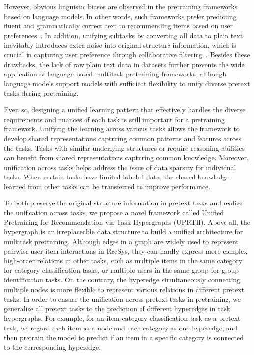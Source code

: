 However, obvious linguistic biases are observed in the pretraining frameworks based on language models. In other words, such frameworks prefer predicting fluent and grammatically correct text to recommending items based on user preferences~\cite{Zhang2021}. In addition, unifying subtasks by converting all data to plain text inevitably introduces extra noise into original structure information, which is crucial in capturing user preference through collaborative filtering~\cite{glrssurvey21}. Besides these drawbacks, the lack of raw plain text data in datasets further prevents the wide application of language-based multitask pretraining frameworks, although language models support models with sufficient flexibility to unify diverse pretext tasks during pretraining.

Even so, designing a unified learning pattern that effectively handles the diverse requirements and nuances of each task is still important for a pretraining framework. Unifying the learning across various tasks allows the framework to develop shared representations capturing common patterns and features across the tasks. Tasks with similar underlying structures or require reasoning abilities can benefit from shared representations capturing common knowledge. Moreover, unification across tasks helps address the issue of data sparsity for individual tasks. When certain tasks have limited labeled data, the shared knowledge learned from other tasks can be transferred to improve performance.

To both preserve the original structure information in pretext tasks and realize the unification across tasks, we propose a novel framework called Unified Pretraining for Recommendation via Task Hypergraphs (UPRTH). Above all, the hypergraph is an irreplaceable data structure to build a unified architecture for multitask pretraining.
Although edges in a graph are widely used to represent pairwise user-item interactions in RecSys, they can hardly express more complex high-order relations in other tasks, such as multiple items in the same category for category classification tasks, or multiple users in the same group for group identification tasks. On the contrary, the hyperedge simultaneously connecting multiple nodes is more flexible to represent various relations in different pretext tasks.
In order to ensure the unification across pretext tasks in pretraining, we generalize all pretext tasks to the prediction of different hyperedges in task hypergraphs. For example, for an item category classification task as a pretext task, we regard each item as a node and each category as one hyperedge, and then pretrain the model to predict if an item in a specific category is connected to the corresponding hyperedge. 

